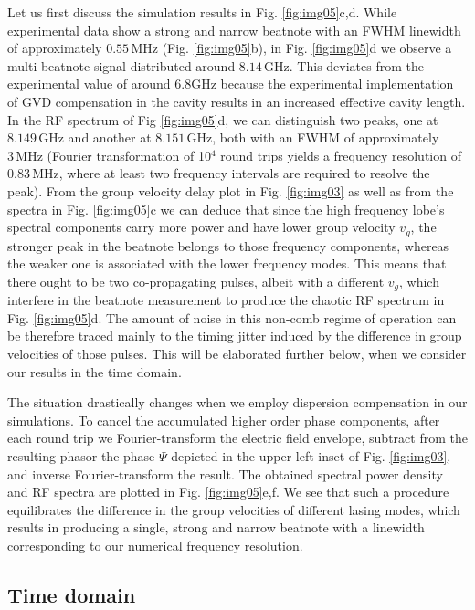 \documentclass[10pt,letterpaper]{article}%
\begin{document}
Let us first discuss the simulation results in Fig. \ref{fig:img05}c,d. While
experimental data show a strong and narrow beatnote with an FWHM linewidth of
approximately $0.55{\,}\mathrm{MHz}$ (Fig. \ref{fig:img05}b), in Fig.
\ref{fig:img05}d we observe a multi-beatnote signal distributed around
$8.14{\,}\mathrm{GHz}$. This deviates from the experimental value of
around\textrm{ }$6.8${\thinspace}$\mathrm{GHz}$ because the experimental
implementation of GVD compensation in the cavity results in an increased
effective cavity length. In the RF spectrum of Fig \ref{fig:img05}d, we can
distinguish two peaks, one at $8.149{\,}\mathrm{GHz}$ and another at
$8.151{\,}\mathrm{GHz}$, both with an FWHM of approximately $3{\,}%
\mathrm{MHz}$ (Fourier transformation of 10$^{4}$ round trips yields a
frequency resolution of $0.83{\,}\mathrm{MHz}$, where at least two frequency
intervals are required to resolve the peak). From the group velocity delay
plot in Fig. \ref{fig:img03} as well as from the spectra in Fig.
\ref{fig:img05}c we can deduce that since the high frequency lobe's spectral
components carry more power and have lower group velocity $v_{g}$, the
stronger peak in the beatnote belongs to those frequency components, whereas
the weaker one is associated with the lower frequency modes. This means that
there ought to be two co-propagating pulses, albeit with a different $v_{g}$,
which interfere in the beatnote measurement to produce the chaotic RF spectrum
in Fig. \ref{fig:img05}d. The amount of noise in this non-comb regime of
operation can be therefore traced mainly to the timing jitter induced by the
difference in group velocities of those pulses. This will be elaborated
further below, when we consider our results in the time domain.

The situation drastically changes when we employ dispersion compensation in
our simulations. To cancel the accumulated higher order phase components,
after each round trip we Fourier-transform the electric field envelope,
subtract from the resulting phasor the phase $\Psi$ depicted in the upper-left
inset of Fig. \ref{fig:img03}, and inverse Fourier-transform the result. The
obtained spectral power density and RF spectra are plotted in Fig.
\ref{fig:img05}e,f. We see that such a procedure equilibrates the difference
in the group velocities of different lasing modes, which results in producing
a single, strong and narrow beatnote with a linewidth corresponding to our
numerical frequency resolution.

\subsection{Time domain}
\end{document}
